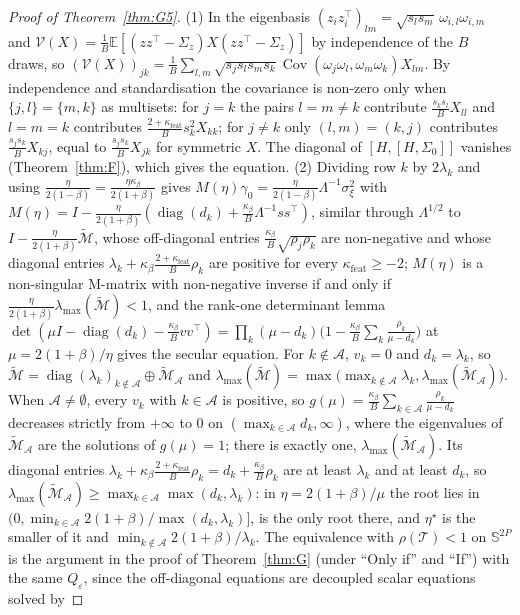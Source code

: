 \documentclass[11pt]{article}
\theoremstyle{remark}
\newcommand{\E}{\mathbb{E}}
\begin{document}
\begin{proof}[Proof of Theorem~\ref{thm:G5}]
(1) In the eigenbasis $(z_iz_i^\top)_{lm}=\sqrt{s_ls_m}\,\omega_{i,l}\omega_{i,m}$ and $\mathcal V(X)=\frac1B\E[(zz^\top-\Sigma_z)X(zz^\top-\Sigma_z)]$ by independence of the $B$ draws, so $(\mathcal V(X))_{jk}=\frac1B\sum_{l,m}\sqrt{s_js_ls_ms_k}\operatorname{Cov}(\omega_j\omega_l,\omega_m\omega_k)X_{lm}$. By independence and standardisation the covariance is non-zero only when $\{j,l\}=\{m,k\}$ as multisets: for $j=k$ the pairs $l=m\ne k$ contribute $\frac{s_ks_l}{B}X_{ll}$ and $l=m=k$ contributes $\frac{2+\kappa_{\mathrm{feat}}}{B}s_k^2X_{kk}$; for $j\ne k$ only $(l,m)=(k,j)$ contributes $\frac{s_js_k}{B}X_{kj}$, equal to $\frac{s_js_k}{B}X_{jk}$ for symmetric $X$. The diagonal of $[H,[H,\Sigma_0]]$ vanishes (Theorem~\ref{thm:F}), which gives the equation. (2) Dividing row $k$ by $2\lambda_k$ and using $\frac{\eta}{2(1-\beta)}=\frac{\eta\kappa_\beta}{2(1+\beta)}$ gives $M(\eta)\gamma_0=\frac{\eta}{2(1-\beta)}\Lambda^{-1}\sigma_\xi^2$ with $M(\eta)=I-\frac{\eta}{2(1+\beta)}(\operatorname{diag}(d_k)+\frac{\kappa_\beta}{B}\Lambda^{-1}ss^\top)$, similar through $\Lambda^{1/2}$ to $I-\frac{\eta}{2(1+\beta)}\widetilde{\mathcal M}$, whose off-diagonal entries $\frac{\kappa_\beta}{B}\sqrt{\rho_j\rho_k}$ are non-negative and whose diagonal entries $\lambda_k+\kappa_\beta\frac{2+\kappa_{\mathrm{feat}}}{B}\rho_k$ are positive for every $\kappa_{\mathrm{feat}}\ge-2$; $M(\eta)$ is a non-singular M-matrix with non-negative inverse if and only if $\frac{\eta}{2(1+\beta)}\lambda_{\max}(\widetilde{\mathcal M})<1$, and the rank-one determinant lemma $\det(\mu I-\operatorname{diag}(d_k)-\frac{\kappa_\beta}{B}vv^\top)=\prod_k(\mu-d_k)\big(1-\frac{\kappa_\beta}{B}\sum_k\frac{\rho_k}{\mu-d_k}\big)$ at $\mu=2(1+\beta)/\eta$ gives the secular equation. For $k\notin\mathcal A$, $v_k=0$ and $d_k=\lambda_k$, so $\widetilde{\mathcal M}=\operatorname{diag}(\lambda_k)_{k\notin\mathcal A}\oplus\widetilde{\mathcal M}_{\mathcal A}$ and $\lambda_{\max}(\widetilde{\mathcal M})=\max\big(\max_{k\notin\mathcal A}\lambda_k,\lambda_{\max}(\widetilde{\mathcal M}_{\mathcal A})\big)$. When $\mathcal A\ne\emptyset$, every $v_k$ with $k\in\mathcal A$ is positive, so $g(\mu)=\frac{\kappa_\beta}{B}\sum_{k\in\mathcal A}\frac{\rho_k}{\mu-d_k}$ decreases strictly from $+\infty$ to $0$ on $(\max_{k\in\mathcal A}d_k,\infty)$, where the eigenvalues of $\widetilde{\mathcal M}_{\mathcal A}$ are the solutions of $g(\mu)=1$; there is exactly one, $\lambda_{\max}(\widetilde{\mathcal M}_{\mathcal A})$. Its diagonal entries $\lambda_k+\kappa_\beta\frac{2+\kappa_{\mathrm{feat}}}{B}\rho_k=d_k+\frac{\kappa_\beta}{B}\rho_k$ are at least $\lambda_k$ and at least $d_k$, so $\lambda_{\max}(\widetilde{\mathcal M}_{\mathcal A})\ge\max_{k\in\mathcal A}\max(d_k,\lambda_k)$: in $\eta=2(1+\beta)/\mu$ the root lies in $(0,\min_{k\in\mathcal A}2(1+\beta)/\max(d_k,\lambda_k)]$, is the only root there, and $\eta^\star$ is the smaller of it and $\min_{k\notin\mathcal A}2(1+\beta)/\lambda_k$. The equivalence with $\rho(\mathcal T)<1$ on $\mathbb S^{2P}$ is the argument in the proof of Theorem~\ref{thm:G} (under ``Only if'' and ``If'') with the same $Q_\varepsilon$, since the off-diagonal equations are decoupled scalar equations solved by 
\end{proof}
\end{document}
